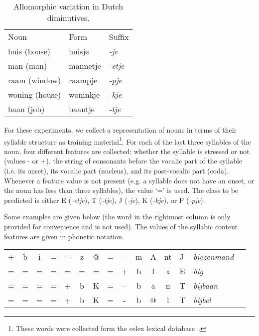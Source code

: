 \documentclass{book}
\begin{document}
\begin{table}[ht]
\begin{center}
\begin{tabular}{l|l|l}
Noun & Form & Suffix \\
\noalign{\smallskip}
\hline
\noalign{\smallskip}
huis (house) & huisje & {\em -je} \\
man (man) & mannetje & {\em -etje\/} \\
raam (window) & raampje & {\em -pje\/} \\
woning (house) & woninkje & {\em -kje\/} \\
baan (job) & baantje & {\em -tje\/} \\
\end{tabular}
\caption{Allomorphic variation in Dutch diminutives.}\label{variation}
\end{center}
\end{table}

For these experiments, we collect a representation of nouns in terms
of their syllable structure as training material\footnote{These words
  were collected form the {\sc celex} lexical
  database~\cite{Baayen+93}.}. For each of the last three syllables of
the noun, four different features are collected: whether the syllable
is stressed or not (values - or +), the string of consonants before
the vocalic part of the syllable (i.e. its onset), its vocalic part
(nucleus), and its post-vocalic part (coda). Whenever a feature value
is not present (e.g. a syllable does not have an onset, or the noun
has less than three syllables), the value `=' is used. The class to be
predicted is either E ({\em -etje}), T ({\em -tje}), J ({\em -je}), K
({\em -kje}), or P ({\em -pje}).

Some examples are given below (the word in the rightmost column is only provided for
convenience and is not used). The values of the syllabic content
features are given in phonetic notation.

\begin{table}[ht]
\begin{center}
\begin{tabular}{cccccccccccc|l|l|l}
+ & b & i & = & - & z & @ & = & - & m & A & nt & J & {\em biezenmand} \\
= & = & = & = & = & = & = & = & + & b & I & x & E & {\em big}\\
= & = & = & = & + & b & K & = & - & b & a & n & T & {\em bijbaan}\\
= & = & = & = & + & b & K & = & - & b & @ & l & T & {\em bijbel}\\
\end{tabular}
\end{center}
\end{table}
\end{document}
